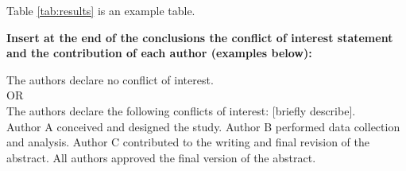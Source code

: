 \documentclass[a4paper,10pt,twocolumn]{article}
\begin{document}
Table \ref*{tab:results} is an example table.

\begin{table}[t]
    \centering
    \renewcommand{\arraystretch}{1.2}
    \caption{Sample table.}
    \label{tab:results}
\end{table}

\textbf{Insert at the end of the conclusions the conflict of interest statement and the contribution of each author (examples below):}

The authors declare no conflict of interest.\\
OR\\
The authors declare the following conflicts of interest: [briefly describe].\\
Author A conceived and designed the study. Author B performed data collection and analysis. Author C contributed to the writing and final revision of the abstract. All authors approved the final version of the abstract.
\end{document}
